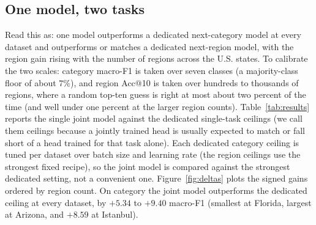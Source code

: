 \subsection{One model, two tasks}
\label{sec:results-part2}
Read this as: one model outperforms a dedicated next-category model at every
dataset and outperforms or matches a dedicated next-region model, with the
region gain rising with the number of regions across the U.S. states.
To calibrate the two scales: category macro-F1 is taken over seven classes (a
majority-class floor of about $7\%$), and region Acc@10 is taken over hundreds to
thousands of regions, where a random top-ten guess is right at most about two
percent of the time (and well under one percent at the larger region counts).
Table~\ref{tab:results} reports the single joint model against the dedicated
single-task ceilings (we call them ceilings because a jointly trained head is
usually expected to match or fall short of a head trained for that task alone).
Each dedicated category ceiling is tuned per dataset over batch size and
learning rate (the region ceilings use the strongest fixed recipe), so the
joint model is compared against the strongest dedicated setting, not a
convenient one.
Figure~\ref{fig:deltas} plots the signed gains ordered by region count. On
category the joint model outperforms the dedicated ceiling at
every dataset, by $+5.34$ to $+9.40$ macro-F1 (smallest at Florida, largest at
Arizona, and $+8.59$ at Istanbul).
